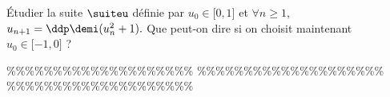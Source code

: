 



\begin{exercice} \;
\'Etudier la suite $\suiteu$ d\'efinie par $u_0\in\lbrack 0,1\rbrack$ et $\forall n \geq 1$, $u_{n+1}=\ddp\demi(u_n^2+1).$
\noindent Que peut-on dire si on choisit maintenant $u_0\in\lbrack -1,0\rbrack$ ?
\end{exercice}


\%\%\%\%\%\%\%\%\%\%\%\%\%\%\%\%\%\%\%\%
\%\%\%\%\%\%\%\%\%\%\%\%\%\%\%\%\%\%\%\%
\%\%\%\%\%\%\%\%\%\%\%\%\%\%\%\%\%\%\%\%




